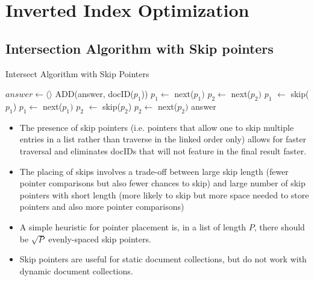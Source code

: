 \documentclass{article}
\begin{document}
\section{Inverted Index Optimization}

\subsection{Intersection Algorithm with Skip pointers}

\begin{algorithm}
\caption{Intersect Algorithm with Skip Pointers}
\begin{algorithmic}
    \State $answer \leftarrow \langle \rangle$
            \State ADD(answer, docID($p_1$))
            \State $p_1 \leftarrow$ next($p_1)$
            \State $p_2 \leftarrow$ next($p_2)$
                    \State $p_1$ $\leftarrow$ skip($p_1$)
                \EndWhile
                \State $p_1 \leftarrow$ next($p_1)$
                    \State $p_2$ $\leftarrow$ skip($p_2$)
                \EndWhile
                \State $p_2 \leftarrow$ next($p_2)$
            \EndIf
        \EndIf
    \EndWhile
    \Return answer
    \EndProcedure
\end{algorithmic}
\end{algorithm}
\begin{itemize}
    \item The presence of skip pointers (i.e. pointers that allow one to skip multiple entries in a list rather than traverse in the linked order only) allows for faster traversal and eliminates docIDs that will not feature in the final result faster.
    
    \item The placing of skips involves a trade-off between large skip length (fewer pointer comparisons but also fewer chances to skip) and large number of skip pointers with short length (more likely to skip but more space needed to store pointers and also more pointer comparisons)
    
    \item A simple heuristic for pointer placement is, in a list of length $P$, there should be $\sqrt{P}$ evenly-spaced skip pointers. 
    
    \item Skip pointers are useful for static document collections, but do not work with dynamic document collections. 
\end{itemize}
\end{document}

